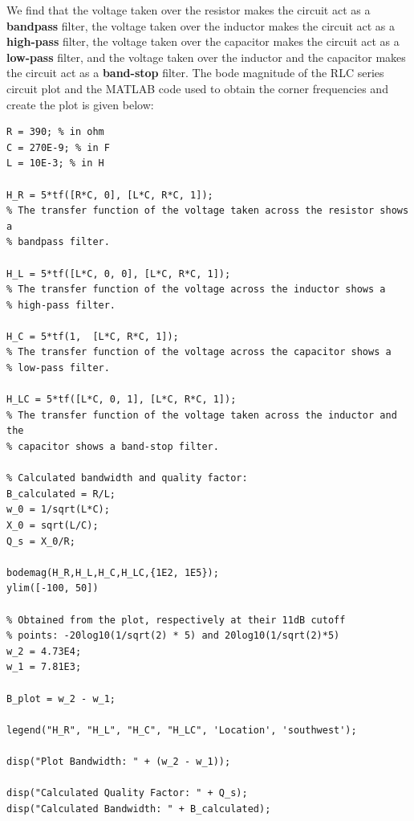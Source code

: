 We find that the voltage taken over the resistor makes the circuit act as a {\bf bandpass} filter, the voltage taken over the
inductor makes the circuit act as a {\bf high-pass} filter,
the voltage taken over the capacitor makes the circuit act as a {\bf low-pass} filter, and the voltage taken over the inductor and the capacitor makes the circuit act as a {\bf band-stop} filter.
The bode magnitude of the RLC series circuit plot and the MATLAB code used to obtain the corner frequencies and create the plot is given below:
\begin{verbatim}
R = 390; % in ohm
C = 270E-9; % in F
L = 10E-3; % in H

H_R = 5*tf([R*C, 0], [L*C, R*C, 1]);
% The transfer function of the voltage taken across the resistor shows a
% bandpass filter.

H_L = 5*tf([L*C, 0, 0], [L*C, R*C, 1]);
% The transfer function of the voltage across the inductor shows a
% high-pass filter.

H_C = 5*tf(1,  [L*C, R*C, 1]);
% The transfer function of the voltage across the capacitor shows a
% low-pass filter.

H_LC = 5*tf([L*C, 0, 1], [L*C, R*C, 1]);
% The transfer function of the voltage taken across the inductor and the
% capacitor shows a band-stop filter.

% Calculated bandwidth and quality factor:
B_calculated = R/L;
w_0 = 1/sqrt(L*C);
X_0 = sqrt(L/C);
Q_s = X_0/R;

bodemag(H_R,H_L,H_C,H_LC,{1E2, 1E5});
ylim([-100, 50])

% Obtained from the plot, respectively at their 11dB cutoff
% points: -20log10(1/sqrt(2) * 5) and 20log10(1/sqrt(2)*5)
w_2 = 4.73E4;
w_1 = 7.81E3;

B_plot = w_2 - w_1;

legend("H_R", "H_L", "H_C", "H_LC", 'Location', 'southwest');

disp("Plot Bandwidth: " + (w_2 - w_1));

disp("Calculated Quality Factor: " + Q_s);
disp("Calculated Bandwidth: " + B_calculated);    
\end{verbatim}